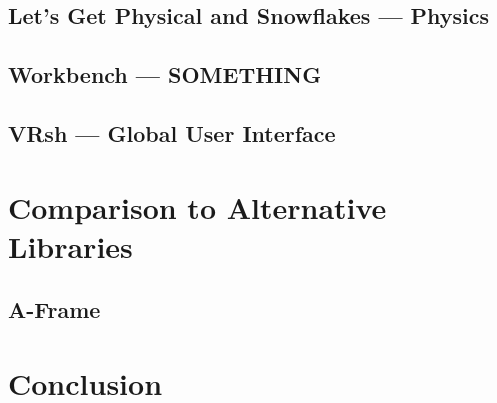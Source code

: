 \documentclass[conference,12pt]{IEEEtran}
\newcommand\name{VRsh}
\begin{document}
\subsection{Let's Get Physical and Snowflakes --- Physics}

\subsection{Workbench --- SOMETHING} %

\subsection{{\name} --- Global User Interface}

\section{Comparison to Alternative Libraries}

\subsection{A-Frame}

\section{Conclusion}

{\printbibliography}
\end{document}
